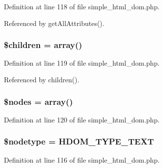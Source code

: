 Definition at line 118 of file simple\+\_\+html\+\_\+dom.\+php.



Referenced by get\+All\+Attributes().

\hypertarget{classsimple__html__dom__node_aafda1a84fe840800c9884c167093f759}{}
\subsubsection[{\$children}]{\setlength{\rightskip}{0pt plus 5cm}\${\bf children} = array()}\label{classsimple__html__dom__node_aafda1a84fe840800c9884c167093f759}


Definition at line 119 of file simple\+\_\+html\+\_\+dom.\+php.



Referenced by children().

\hypertarget{classsimple__html__dom__node_afc84f46342a660cca8589570197bc421}{}
\subsubsection[{\$nodes}]{\setlength{\rightskip}{0pt plus 5cm}\$nodes = array()}\label{classsimple__html__dom__node_afc84f46342a660cca8589570197bc421}


Definition at line 120 of file simple\+\_\+html\+\_\+dom.\+php.

\hypertarget{classsimple__html__dom__node_abc1baa5da51bb7404ed787754af7e28b}{}
\subsubsection[{\$nodetype}]{\setlength{\rightskip}{0pt plus 5cm}\$nodetype = {\bf H\+D\+O\+M\+\_\+\+T\+Y\+P\+E\+\_\+\+T\+E\+X\+T}}\label{classsimple__html__dom__node_abc1baa5da51bb7404ed787754af7e28b}


Definition at line 116 of file simple\+\_\+html\+\_\+dom.\+php.

